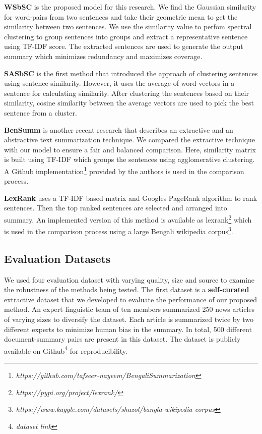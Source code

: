 \documentclass[acmlarge]{acmart}
\begin{document}
\textbf{WSbSC} is the proposed model for this research. We find the Gaussian similarity for word-pairs from two sentences and take their geometric mean to get the similarity between two sentences. We use the similarity value to perfom spectral clustering to group sentences into groups and extract a representative sentence using TF-IDF score. The extracted sentences are used to generate the output summary which minimizes redundancy and maximizes coverage.

\textbf{SASbSC} \cite{roychowdhury-etal-2022-spectral-base} is the first method that introduced the approach of clustering sentences using sentence similarity. However, it uses the average of word vectors in a sentence for calculating similarity. After clustering the sentences based on their similarity, cosine similarity between the average vectors are used to pick the best sentence from a cluster.

\textbf{BenSumm} \cite{chowdhury-etal-2021-tfidf-clustering} is another recent research that describes an extractive and an abstractive text summarization technique. We compared the extractive technique with our model to ensure a fair and balanced comparison. Here, similarity matrix is built using TF-IDF which groups the sentences using agglomerative clustering. A Github implementation\footnote{\textit{https://github.com/tafseer-nayeem/BengaliSummarization}} provided by the authors is used in the comparison process.

\textbf{LexRank} \cite{Erkan-lexRank-2004} uses a TF-IDF based matrix and Googles PageRank algorithm \cite{page-PageRank-1999} to rank sentences. Then the top ranked sentences are selected and arranged into summary. An implemented version of this method is available as lexrank\footnote{\textit{https://pypi.org/project/lexrank/}} which is used in the comparison process using a large Bengali wikipedia corpus\footnote{\textit{https://www.kaggle.com/datasets/shazol/bangla-wikipedia-corpus}}.
\subsection{Evaluation Datasets}\label{subsec:evaluation-datasets}
We used four evaluation dataset with varying quality, size and source to examine the robustness of the methods being tested. The first dataset is a \textbf{self-curated} extractive dataset that we developed to evaluate the performance of our proposed method. An expert linguistic team of ten members summarized 250 news articles of varying sizes to diversify the dataset. Each article is summarized twice by two different experts to minimize human bias in the summary. In total, 500 different document-summary pairs are present in this dataset. The dataset is publicly available on Github\footnote{\textit{dataset link}} for reproducibility.
\end{document}
